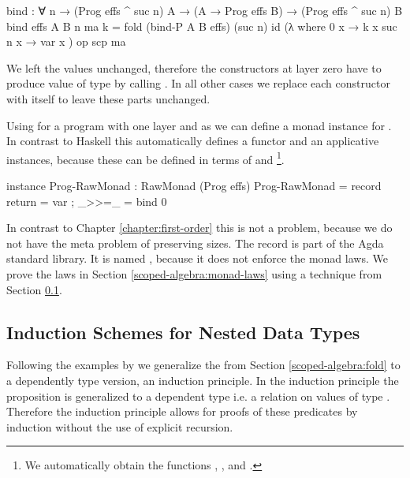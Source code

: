 \begin{code}
bind : ∀ n → (Prog effs ^ suc n) A → (A → Prog effs B) →
  (Prog effs ^ suc n) B
bind {effs} {A} {B} n ma k = fold (bind-P A B effs) (suc n) id (λ where
    {0}      x → k x
    {suc n}  x → var x
  ) op scp ma
\end{code}
We left the values unchanged, therefore the 
constructors at layer zero have to produce value of type
\AgdaSpace{}\AgdaSpace{}
by calling .
In all other cases we replace each constructor with itself to leave these parts
unchanged.

Using \AgdaFunction{>>=} for a program with one layer and
 as  we can define a monad
instance for \AgdaSpace{}.
In contrast to Haskell this automatically defines a functor and an applicative
instances, because these can be defined in terms of \AgdaFunction{>>=} and
\footnote{We automatically obtain the functions
  \AgdaFunction{<\$>}, \AgdaFunction{<*>},  and
  \AgdaFunction{>>}. }.
\begin{code}
instance
  Prog-RawMonad : RawMonad (Prog effs)
  Prog-RawMonad = record { return = var ; _>>=_ = bind 0 }
\end{code}
In contrast to Chapter \ref{chapter:first-order} this is not a problem, because
we do not have the meta problem of preserving sizes.
The record is part of the Agda standard library.
It is named , because it does not enforce the monad laws.
We prove the laws in Section \ref{scoped-algebra:monad-laws} using
a technique from Section \ref{scoped-algebra:ind}.


\subsection{Induction Schemes for Nested Data Types}
\label{scoped-algebra:ind}

Following the examples by \textcite{DBLP:journals/corr/abs-1806-05230} we
generalize the  from Section \ref{scoped-algebra:fold} to a
dependently type version, an induction principle.
In the induction principle the proposition  is generalized to a
dependent type i.e. a relation on values of type 
\AgdaSpace{}\AgdaSpace{}.
Therefore the induction principle allows for proofs of these predicates by
induction without the use of explicit recursion.

